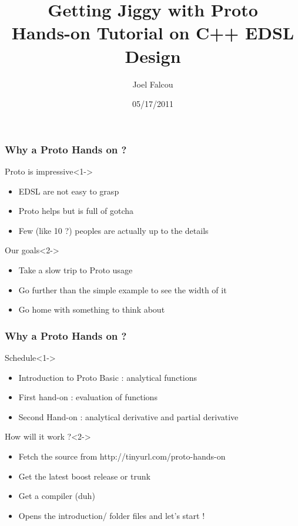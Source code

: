 \documentclass[color=option]{beamer}
\title[Boost'Con 2011]{Getting Jiggy with Proto\\
Hands-on Tutorial on C++ EDSL Design}
\author{Joel Falcou}
\institute{LRI, University Paris Sud XI}
\date{05/17/2011}
\begin{document}
\frame{\titlepage}

\frame
{
  \frametitle{Why a Proto Hands on ?}
  \begin{block}{Proto is impressive}<1->
  \footnotesize
  \begin{itemize}
  \footnotesize
  \item EDSL are not easy to grasp
  \item Proto helps but is full of gotcha
  \item Few (like 10 ?) peoples are actually up to the details
  \end{itemize}
  \end{block}

  \begin{block}{Our goals}<2->
  \footnotesize
  \begin{itemize}
  \footnotesize
  \item Take a slow trip to Proto usage
  \item Go further than the simple example to see the width of it
  \item Go home with something to think about
  \end{itemize}
  \end{block}
}

\frame
{
  \frametitle{Why a Proto Hands on ?}
  \begin{block}{Schedule}<1->
  \footnotesize
  \begin{itemize}
  \footnotesize
  \item Introduction to Proto Basic : analytical functions
  \item First hand-on : evaluation of functions
  \item Second Hand-on : analytical derivative and partial derivative
  \end{itemize}
  \end{block}

  \begin{block}{How will it work ?}<2->
  \footnotesize
  \begin{itemize}
  \footnotesize
  \item Fetch the source from http://tinyurl.com/proto-hands-on
  \item Get the latest boost release or trunk
  \item Get a compiler (duh)
  \item Opens the introduction/ folder files and let's start !
  \end{itemize}
  \end{block}
}
\end{document}
